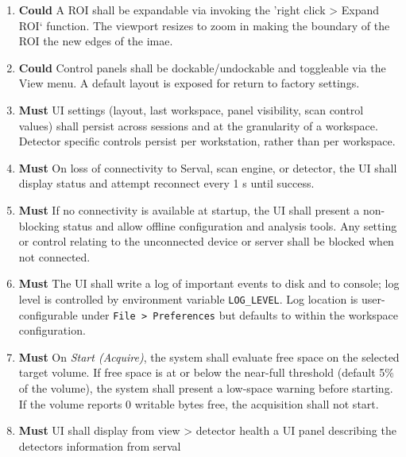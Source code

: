 \documentclass[10pt]{article}
\newcommand{\PriorityTag}[2]{%
    \colorbox{#2!25}{\footnotesize\textsf{\textbf{#1}}}\hspace{0.6em}}
\newcommand{\must}{\leavevmode\PriorityTag{Must}{green}}
\newcommand{\could}{\leavevmode\PriorityTag{Could}{cyan}}
\newcounter{reqgrp}[section] %
\newcounter{reqno}
\newcommand{\reqprefix}{GEN}
\newenvironment{requirements}[1]{%
    \renewcommand{\reqprefix}{#1}%
    \refstepcounter{reqgrp}%
    \setcounter{reqno}{0}%
    \begin{enumerate}[leftmargin=*]
    }{\end{enumerate}}
\begin{document}
\begin{requirements}{UI}
        \item \could {}
        {A ROI shall be expandable via invoking the 'right click > Expand ROI` function. The viewport resizes to zoom in making the boundary of the ROI the new edges of the imae.}

        \item \could {}
        {Control panels shall be dockable/undockable and toggleable via the View menu. A default layout is exposed for return to factory settings. }

        \item \must {}
        {UI settings (layout, last workspace, panel visibility, scan control values) shall persist across sessions and at the granularity of a workspace. Detector specific controls persist per workstation, rather than per workspace.}

        \item \must {}
        {On loss of connectivity to Serval, scan engine, or detector, the UI shall display status and attempt reconnect every 1 s until success.}

        \item \must {}
        {If no connectivity is available at startup, the UI shall present a non-blocking status and allow offline configuration and analysis tools. Any setting or control relating to the unconnected device or server shall be blocked when not connected.}

        \item \must {}
        {The UI shall write a log of important events to disk and to console; log level is controlled by environment variable \texttt{LOG\_LEVEL}. Log location is user-configurable under \texttt{File > Preferences} but defaults to within the workspace configuration.}

        \item \must {}
        {On \emph{Start (Acquire)}, the system shall evaluate free space on the selected target volume. If free space is at or below the near-full threshold (default 5\% of the volume), the system shall present a low-space warning before starting. If the volume reports 0 writable bytes free, the acquisition shall not start.}

        \item \must {}
        {UI shall display from view > detector health a UI panel describing the detectors information from serval}


    \end{requirements}
\end{document}
